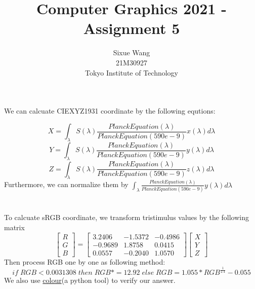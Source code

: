 \documentclass{article}
\title{Computer Graphics 2021 - Assignment 5}
\author{Sixue Wang\\21M30927\\Tokyo Institute of Technology}
\begin{document}
\maketitle

\section{}

We can calcuate CIEXYZ1931 coordinate by the following equtions:

\begin{equation}
   X =  \int_{\lambda} S(\lambda)\frac{PlanckEquation(\lambda)}{PlanckEquation(590e-9)} x(\lambda) d\lambda
\end{equation}
\begin{equation}
   Y =  \int_{\lambda} S(\lambda)\frac{PlanckEquation(\lambda)}{PlanckEquation(590e-9)} y(\lambda) d\lambda
\end{equation}
\begin{equation}
   Z =  \int_{\lambda} S(\lambda)\frac{PlanckEquation(\lambda)}{PlanckEquation(590e-9)} z(\lambda) d\lambda
\end{equation}
Furthermore, we can normalize them by $\int_{\lambda} \frac{PlanckEquation(\lambda)}{PlanckEquation(590e-9)} y(\lambda) d\lambda$

\section{}
To calcuate sRGB coordinate, we transform tristimulus values by the following matrix
\begin{equation}
  \begin{bmatrix}
    R \\ G \\ B
  \end{bmatrix}
  =
  \begin{bmatrix}
    3.2406  & -1.5372 & -0.4986 \\
    -0.9689 & 1.8758  & 0.0415  \\
    0.0557  & -0.2040 & 1.0570
  \end{bmatrix}
  \begin{bmatrix}
    X \\ Y \\ Z
  \end{bmatrix}
\end{equation}
Then process RGB one by one as following method:
\begin{equation}
  if \; RGB < 0.0031308 \; then \;
    RGB *= 12.92 \;
  else \;
    RGB = 1.055 * RGB^{\frac{1}{2.4}} - 0.055
\end{equation}
We also use \href{https://github.com/colour-science/colour}{colour}(a python tool) to verify our answer.
\end{document}
